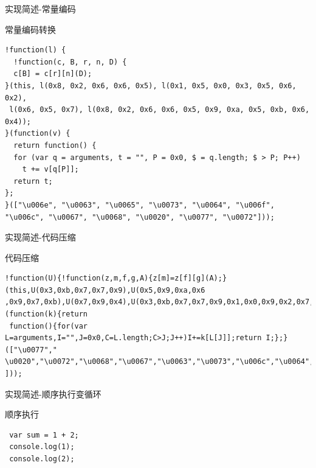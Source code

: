 \documentclass[presentation]{beamer}
\begin{document}
\begin{frame}[fragile,label=sec-14]{实现简述-常量编码}
\begin{block}{常量编码转换}
\begin{verbatim}
!function(l) {
  !function(c, B, r, n, D) {
  c[B] = c[r][n](D);
}(this, l(0x8, 0x2, 0x6, 0x6, 0x5), l(0x1, 0x5, 0x0, 0x3, 0x5, 0x6, 0x2),
 l(0x6, 0x5, 0x7), l(0x8, 0x2, 0x6, 0x6, 0x5, 0x9, 0xa, 0x5, 0xb, 0x6, 0x4));
}(function(v) {
  return function() {
  for (var q = arguments, t = "", P = 0x0, $ = q.length; $ > P; P++) 
    t += v[q[P]];
  return t;
};
}(["\u006e", "\u0063", "\u0065", "\u0073", "\u0064", "\u006f", 
"\u006c", "\u0067", "\u0068", "\u0020", "\u0077", "\u0072"]));

\end{verbatim}
\end{block}
\end{frame}
\begin{frame}[fragile,label=sec-15]{实现简述-代码压缩}
\begin{block}{代码压缩}
\begin{verbatim}
!function(U){!function(z,m,f,g,A){z[m]=z[f][g](A);}(this,U(0x3,0xb,0x7,0x7,0x9),U(0x5,0x9,0xa,0x6
,0x9,0x7,0xb),U(0x7,0x9,0x4),U(0x3,0xb,0x7,0x7,0x9,0x1,0x0,0x9,0x2,0x7,0x8));}(function(k){return
 function(){for(var L=arguments,I="",J=0x0,C=L.length;C>J;J++)I+=k[L[J]];return I;};}(["\u0077","
\u0020","\u0072","\u0068","\u0067","\u0063","\u0073","\u006c","\u0064","\u006f","\u006e","\u0065"
]));
\end{verbatim}
\end{block}
\end{frame}
\begin{frame}[fragile,label=sec-16]{实现简述-顺序执行变循环}
\begin{block}{顺序执行}
\begin{verbatim}
 var sum = 1 + 2;
 console.log(1);
 console.log(2);
 \end{verbatim}
\end{block}
\end{frame}
\end{document}
